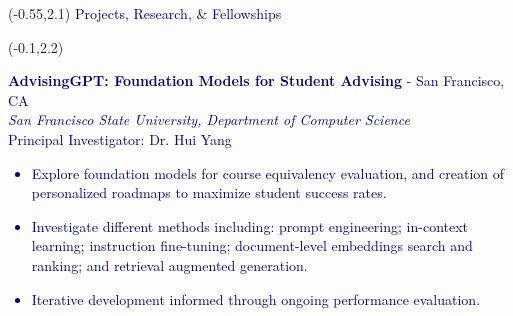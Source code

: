 \documentclass[hidelinks, 10pt]{article}
\newcommand{\bodyspacing}{1mm}
\begin{document}
\begin{textblock}{9.2}(-0.55,2.1)
    \setlength{\parindent}{0cm}
    \large
    \textcolor{navy}{Projects, Research, \& Fellowships}
\end{textblock}

\vspace{-1mm}


\begin{textblock}{8.75}(-0.1,2.2)
    \setlength{\parindent}{0cm}
    \small
    \vspace{5mm}

    \textcolor{navy}{\textbf{AdvisingGPT: Foundation Models for Student
            Advising} - San Francisco, CA\\
        \emph{San Francisco State University, Department of Computer Science}\\
        Principal Investigator: Dr. Hui Yang
        \makeatletter
        \def\@listi{\orig@listi\topsep=0.3\baselineskip}
        \makeatother
        \begin{itemize}[leftmargin=5mm]
            \setlength\itemsep{-0.25em}
            \item Explore foundation models for course equivalency evaluation,
                  and creation of personalized roadmaps to maximize student success rates.
            \item Investigate different methods including: prompt engineering;
                  in-context learning; instruction fine-tuning; document-level
                  embeddings search and ranking; and retrieval augmented generation.
            \item Iterative development informed through ongoing performance
                  evaluation.
        \end{itemize}}

    \vspace{\bodyspacing}


\end{textblock}
\end{document}
